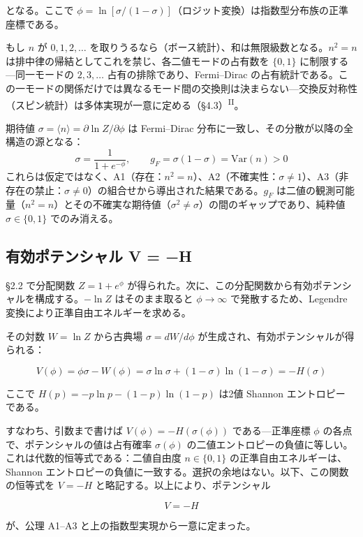 \documentclass[fontsize=11pt,paper=a4,lualatex]{jlreq}
\newcommand{\PII}{\textsuperscript{\textup{II}}}
\begin{document}
となる。ここで $\phi = \ln[\sigma/(1{-}\sigma)]$（ロジット変換）は指数型分布族の正準座標である。

もし $n$ が $0, 1, 2, \dots$ を取りうるなら（ボース統計）、和は無限級数となる。$n^2 = n$ は排中律の帰結としてこれを禁じ、各二値モードの占有数を $\{0,1\}$ に制限する---同一モードの $2, 3, \dots$ 占有の排除であり、Fermi--Dirac の占有統計である。この一モードの関係だけでは異なるモード間の交換則は決まらない---交換反対称性（スピン統計）は多体実現が一意に定める（\S4.3）\PII{}。

期待値 $\sigma = \langle n \rangle = \partial\ln Z/\partial\phi$ は Fermi--Dirac 分布に一致し、その分散が以降の全構造の源となる：
\[
  \sigma = \frac{1}{1+e^{-\phi}}, \qquad
  g_F = \sigma(1{-}\sigma) = \mathrm{Var}(n) > 0
\]
これらは仮定ではなく、A1（存在：$n^2 = n$）、A2（不確実性：$\sigma \neq 1$）、A3（非存在の禁止：$\sigma \neq 0$）の組合せから導出された結果である。$g_F$ は二値の観測可能量（$n^2 = n$）とその不確実な期待値（$\sigma^2 \neq \sigma$）の間のギャップであり、純粋値 $\sigma \in \{0,1\}$ でのみ消える。

\subsection{有効ポテンシャル V =
−H}\label{ux6709ux52b9ux30ddux30c6ux30f3ux30b7ux30e3ux30eb-v-h}

§2.2 で分配関数 $Z = 1+e^{\phi}$ が得られた。次に、この分配関数から有効ポテンシャルを構成する。$-\ln Z$ はそのまま取ると $\phi \to \infty$ で発散するため、Legendre 変換により正準自由エネルギーを求める。

その対数 $W = \ln Z$ から古典場 $\sigma = dW/d\phi$ が生成され、有効ポテンシャルが得られる：

\[V(\phi) = \phi\sigma − W(\phi) = \sigma\ln\sigma + (1−\sigma)\ln(1−\sigma) = −H(\sigma)\]

ここで $H(p) = −p\ln p − (1−p)\ln(1−p)$ は2値 Shannon エントロピー \cite{shannon} である。

すなわち、引数まで書けば $V(\phi) = -H(\sigma(\phi))$ である---正準座標 $\phi$ の各点で、ポテンシャルの値は占有確率 $\sigma(\phi)$ の二値エントロピーの負値に等しい。これは代数的恒等式である：二値自由度 $n \in \{0,1\}$ の正準自由エネルギーは、Shannon エントロピーの負値に一致する。選択の余地はない。以下、この関数の恒等式を $V = -H$ と略記する。以上により、ポテンシャル

\[V = -H\]

が、公理 A1--A3 と上の指数型実現から一意に定まった。
\end{document}
